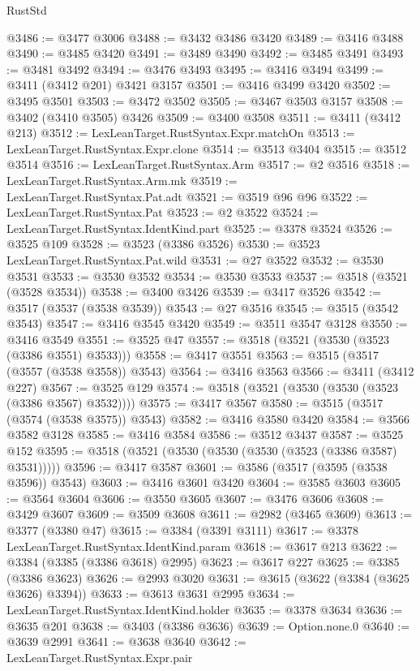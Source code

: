 \begin{lexlean}{RustStd}
\begin{coremodule}
@3486 := @3477 @3006
@3488 := @3432 @3486 @3420
@3489 := @3416 @3488
@3490 := @3485 @3420
@3491 := @3489 @3490
@3492 := @3485 @3491
@3493 := @3481 @3492
@3494 := @3476 @3493
@3495 := @3416 @3494
@3499 := @3411 (@3412 @201) @3421 @3157
@3501 := @3416 @3499 @3420
@3502 := @3495 @3501
@3503 := @3472 @3502
@3505 := @3467 @3503 @3157
@3508 := @3402 (@3410 @3505) @3426
@3509 := @3400 @3508
@3511 := @3411 (@3412 @213)
@3512 := LexLeanTarget.RustSyntax.Expr.matchOn
@3513 := LexLeanTarget.RustSyntax.Expr.clone
@3514 := @3513 @3404
@3515 := @3512 @3514
@3516 := LexLeanTarget.RustSyntax.Arm
@3517 := @2 @3516
@3518 := LexLeanTarget.RustSyntax.Arm.mk
@3519 := LexLeanTarget.RustSyntax.Pat.adt
@3521 := @3519 @96 @96
@3522 := LexLeanTarget.RustSyntax.Pat
@3523 := @2 @3522
@3524 := LexLeanTarget.RustSyntax.IdentKind.part
@3525 := @3378 @3524
@3526 := @3525 @109
@3528 := @3523 (@3386 @3526)
@3530 := @3523 LexLeanTarget.RustSyntax.Pat.wild
@3531 := @27 @3522
@3532 := @3530 @3531
@3533 := @3530 @3532
@3534 := @3530 @3533
@3537 := @3518 (@3521 (@3528 @3534))
@3538 := @3400 @3426
@3539 := @3417 @3526
@3542 := @3517 (@3537 (@3538 @3539))
@3543 := @27 @3516
@3545 := @3515 (@3542 @3543)
@3547 := @3416 @3545 @3420
@3549 := @3511 @3547 @3128
@3550 := @3416 @3549
@3551 := @3525 @47
@3557 := @3518 (@3521 (@3530 (@3523 (@3386 @3551) @3533)))
@3558 := @3417 @3551
@3563 := @3515 (@3517 (@3557 (@3538 @3558)) @3543)
@3564 := @3416 @3563
@3566 := @3411 (@3412 @227)
@3567 := @3525 @129
@3574 := @3518 (@3521 (@3530 (@3530 (@3523 (@3386 @3567) @3532))))
@3575 := @3417 @3567
@3580 := @3515 (@3517 (@3574 (@3538 @3575)) @3543)
@3582 := @3416 @3580 @3420
@3584 := @3566 @3582 @3128
@3585 := @3416 @3584
@3586 := @3512 @3437
@3587 := @3525 @152
@3595 := @3518 (@3521 (@3530 (@3530 (@3530 (@3523 (@3386 @3587) @3531)))))
@3596 := @3417 @3587
@3601 := @3586 (@3517 (@3595 (@3538 @3596)) @3543)
@3603 := @3416 @3601 @3420
@3604 := @3585 @3603
@3605 := @3564 @3604
@3606 := @3550 @3605
@3607 := @3476 @3606
@3608 := @3429 @3607
@3609 := @3509 @3608
@3611 := @2982 (@3465 @3609)
@3613 := @3377 (@3380 @47)
@3615 := @3384 (@3391 @3111)
@3617 := @3378 LexLeanTarget.RustSyntax.IdentKind.param
@3618 := @3617 @213
@3622 := @3384 (@3385 (@3386 @3618) @2995)
@3623 := @3617 @227
@3625 := @3385 (@3386 @3623)
@3626 := @2993 @3020
@3631 := @3615 (@3622 (@3384 (@3625 @3626) @3394))
@3633 := @3613 @3631 @2995
@3634 := LexLeanTarget.RustSyntax.IdentKind.holder
@3635 := @3378 @3634
@3636 := @3635 @201
@3638 := @3403 (@3386 @3636)
@3639 := Option.none.{0}
@3640 := @3639 @2991
@3641 := @3638 @3640
@3642 := LexLeanTarget.RustSyntax.Expr.pair

\end{coremodule}
\end{lexlean}
